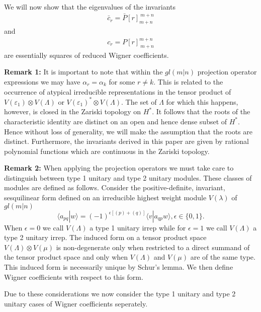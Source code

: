 \documentclass[12pt]{article}
\begin{document}
We will now show that the eigenvalues of the invariants 
\begin{align*}
\bar{c}_r = \bar{P}[r]_{m+n}^{\ m+n}
\end{align*}
and 
\begin{align*}
c_r = P[r]_{\ m+n}^{m+n}
\end{align*}
are essentially squares of reduced Wigner coefficients. 

{\bf Remark 1:} 
It is important to note that within the $gl(m|n)$ projection operator expressions we may have $\alpha_r = \alpha_k$ for some $r \neq k$. This is related to the occurrence of atypical irreducible representations in the tensor product
of $V({\varepsilon_1})\otimes V(\Lambda)$ or $V({\varepsilon_1})^*\otimes V(\Lambda)$. The
set of $\Lambda$ for which this happens, however, is closed in the Zariski topology
\cite{Hump1972} on $H^*$. It follows that the roots of the characteristic identity are distinct on an open and hence dense subset of
$H^*$. Hence without loss of generality, we will make the assumption that the roots are distinct. Furthermore, the invariants derived in this paper are given by rational
polynomial functions which are continuous in the Zariski topology. 

{\bf Remark 2:} 
When applying the projection operators we must take care to distinguish between type 1 unitary and type 2 unitary modules. These classes of modules are defined as follows. Consider the positive-definite, invariant, sesquilinear form defined on an irreducible highest weight module $V(\lambda)$ of $gl(m|n)$ 
$$
\langle a_{pq} | w \rangle = (-1)^{\epsilon [(p) + (q)]} \langle v | a_{qp} w \rangle , \epsilon  \in \{0,1\}.
$$
When $\epsilon = 0$ we call $V(\Lambda)$ a type 1 unitary irrep while for $\epsilon = 1$ we call $V(\Lambda)$ a type 2 unitary irrep. The induced form on a tensor product space $V(\Lambda) \otimes V(\mu)$ is non-degenerate only when restricted to a direct summand of the tensor product space and only when $ V(\Lambda)$ and $V(\mu)$ are of the same type. This induced form is necessarily unique by Schur's lemma. We then define Wigner coefficients with respect to this form. 

Due to these considerations we now consider the type 1 unitary and type 2 unitary cases of Wigner coefficients seperately.
\end{document}
